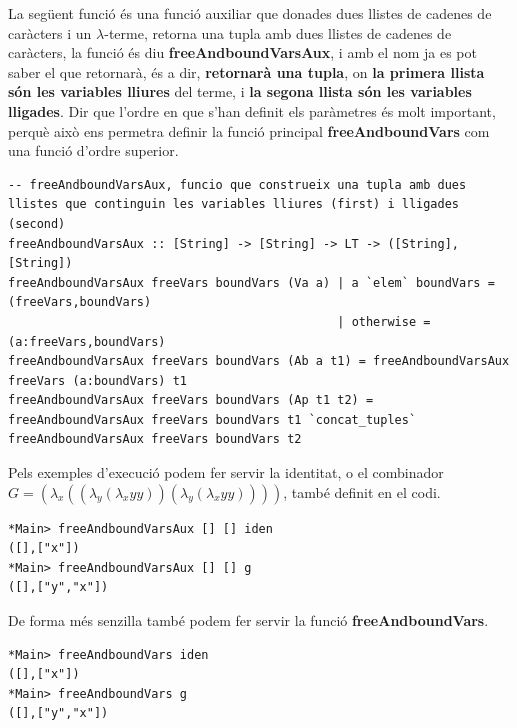 \documentclass[10pt,a4paper]{article}
\begin{document}
\clearpage

La següent funció és una funció auxiliar que donades dues llistes de cadenes de caràcters i un $\lambda$-terme, retorna una tupla amb dues llistes de cadenes de caràcters, la funció és diu \textbf{freeAndboundVarsAux}, i amb el nom ja es pot saber el que retornarà, és a dir, \textbf{retornarà una tupla}, on \textbf{la primera llista són les variables lliures} del terme, i \textbf{la segona llista són les variables lligades}. Dir que l'ordre en que s'han definit els paràmetres és molt important, perquè això ens permetra definir la funció principal \textbf{freeAndboundVars} com una funció d'ordre superior.

\lstset{language=Haskell, breaklines=true, basicstyle=\footnotesize}
\begin{lstlisting}[frame=mystyle]
-- freeAndboundVarsAux, funcio que construeix una tupla amb dues llistes que continguin les variables lliures (first) i lligades (second)
freeAndboundVarsAux :: [String] -> [String] -> LT -> ([String],[String])
freeAndboundVarsAux freeVars boundVars (Va a) | a `elem` boundVars = (freeVars,boundVars)
                                              | otherwise = (a:freeVars,boundVars)
freeAndboundVarsAux freeVars boundVars (Ab a t1) = freeAndboundVarsAux freeVars (a:boundVars) t1
freeAndboundVarsAux freeVars boundVars (Ap t1 t2) = freeAndboundVarsAux freeVars boundVars t1 `concat_tuples` freeAndboundVarsAux freeVars boundVars t2
\end{lstlisting}

Pels exemples d'execució podem fer servir la identitat, o el combinador $G = (\lambda_x ((\lambda_y (\lambda_x  y y)) (\lambda_y (\lambda_x  y y))))$, també definit en el codi.

\lstset{language=Haskell, breaklines=true, basicstyle=\footnotesize}
\begin{lstlisting}[frame=mystyle]
*Main> freeAndboundVarsAux [] [] iden
([],["x"])
*Main> freeAndboundVarsAux [] [] g
([],["y","x"])
\end{lstlisting}

De forma més senzilla també podem fer servir la funció \textbf{freeAndboundVars}.

\lstset{language=Haskell, breaklines=true, basicstyle=\footnotesize}
\begin{lstlisting}[frame=mystyle]
*Main> freeAndboundVars iden
([],["x"])
*Main> freeAndboundVars g
([],["y","x"])
\end{lstlisting}
\end{document}
